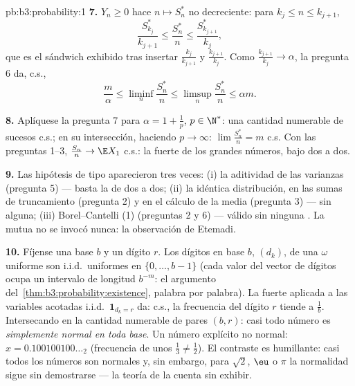 \begin{solution}{pb:b3:probability:1}
\textbf{7.} $Y_n \geq 0$ hace $n \mapsto S^*_n$ no decreciente: para
$k_j \leq n \leq k_{j+1}$,
\[
\frac{S^*_{k_j}}{k_{j+1}} \leq \frac{S^*_n}{n} \leq
\frac{S^*_{k_{j+1}}}{k_j},
\]
que es el sándwich exhibido tras insertar $\frac{k_j}{k_{j+1}}$ y
$\frac{k_{j+1}}{k_j}$. Como $\frac{k_{j+1}}{k_j} \to \alpha$, la
pregunta 6 da, c.s.,
\[
\frac m\alpha \leq \liminf_n\frac{S^*_n}n \leq
\limsup_n\frac{S^*_n}n \leq \alpha m .
\]

\textbf{8.} Aplíquese la pregunta 7 para $\alpha = 1 + \frac1p$, $p
\in \N^*$: una cantidad numerable de sucesos c.s.; en su intersección,
haciendo $p \to \infty$: $\lim\frac{S^*_n}n =
m$ c.s. Con las preguntas 1--3, $\frac{S_n}n \to \E X_1$ c.s.: la
 fuerte de los grandes números,
bajo  dos a dos.

\textbf{9.} Las hipótesis de tipo  aparecieron tres veces:
(i) la aditividad de las varianzas (pregunta 5) --- basta la de dos a
dos; (ii) la idéntica distribución, en las sumas de truncamiento
(pregunta 2) y en el cálculo de la media (pregunta 3) --- sin
 alguna; (iii)
Borel--Cantelli (1) (preguntas 2 y 6) --- válido sin ninguna
. La
 mutua 
no se invocó nunca: la observación de Etemadi.

\textbf{10.} Fíjense una base $b$ y un dígito $r$. Los dígitos en base
$b$, $(d_k)$, de una $\omega$ uniforme son i.i.d.\ uniformes en
$\{0, \dots, b-1\}$ (cada valor del vector de dígitos ocupa un intervalo
de longitud $b^{-m}$: el argumento
del~\cref{thm:b3:probability:existence}, palabra por palabra). La
 fuerte aplicada a las variables
acotadas i.i.d.\ $\mathbf
1_{d_k = r}$ da: c.s., la frecuencia del dígito $r$ tiende a $\frac1b$.
Intersecando en la cantidad numerable de pares $(b, r)$: casi todo
número es \emph{simplemente normal en toda base}. Un número explícito no
normal: $x = 0.100100100\ldots_2$ (frecuencia de unos
$\frac13 \neq \frac12$). El contraste es humillante: casi todos los
números son normales y, sin embargo, para $\sqrt2$, $\eu$ o $\pi$ la
normalidad sigue sin demostrarse --- la teoría de la
 cuenta sin exhibir.


\end{solution}
